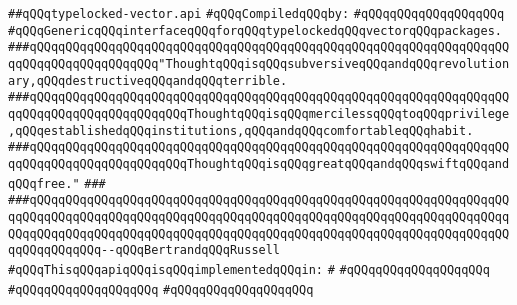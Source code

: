 \label{src/lib/std/src/typelocked-vector.api}
\verb|##qQQqtypelocked-vector.api|\newline
\newline
\verb|#qQQqCompiledqQQqby:|\newline
\verb|#qQQqqQQqqQQqqQQqqQQq|\newline
\newline
\newline
\newline
\verb|#qQQqGenericqQQqinterfaceqQQqforqQQqtypelockedqQQqvectorqQQqpackages.|\newline
\newline
\newline
\newline
\verb|###qQQqqQQqqQQqqQQqqQQqqQQqqQQqqQQqqQQqqQQqqQQqqQQqqQQqqQQqqQQqqQQqqQQqqQQqqQQqqQQqqQQqqQQq"ThoughtqQQqisqQQqsubversiveqQQqandqQQqrevolutionary,qQQqdestructiveqQQqandqQQqterrible.|\newline
\verb|###qQQqqQQqqQQqqQQqqQQqqQQqqQQqqQQqqQQqqQQqqQQqqQQqqQQqqQQqqQQqqQQqqQQqqQQqqQQqqQQqqQQqqQQqqQQqThoughtqQQqisqQQqmercilessqQQqtoqQQqprivilege,qQQqestablishedqQQqinstitutions,qQQqandqQQqcomfortableqQQqhabit.|\newline
\verb|###qQQqqQQqqQQqqQQqqQQqqQQqqQQqqQQqqQQqqQQqqQQqqQQqqQQqqQQqqQQqqQQqqQQqqQQqqQQqqQQqqQQqqQQqqQQqThoughtqQQqisqQQqgreatqQQqandqQQqswiftqQQqandqQQqfree."|\newline
\verb|###|\newline
\verb|###qQQqqQQqqQQqqQQqqQQqqQQqqQQqqQQqqQQqqQQqqQQqqQQqqQQqqQQqqQQqqQQqqQQqqQQqqQQqqQQqqQQqqQQqqQQqqQQqqQQqqQQqqQQqqQQqqQQqqQQqqQQqqQQqqQQqqQQqqQQqqQQqqQQqqQQqqQQqqQQqqQQqqQQqqQQqqQQqqQQqqQQqqQQqqQQqqQQqqQQqqQQqqQQqqQQqqQQqqQQq--qQQqBertrandqQQqRussell|\newline
\newline
\newline
\verb|#qQQqThisqQQqapiqQQqisqQQqimplementedqQQqin:|\newline
\verb|#|\newline
\verb|#qQQqqQQqqQQqqQQqqQQq|\newline
\verb|#qQQqqQQqqQQqqQQqqQQq|\newline
\verb|#qQQqqQQqqQQqqQQqqQQq|\newline

